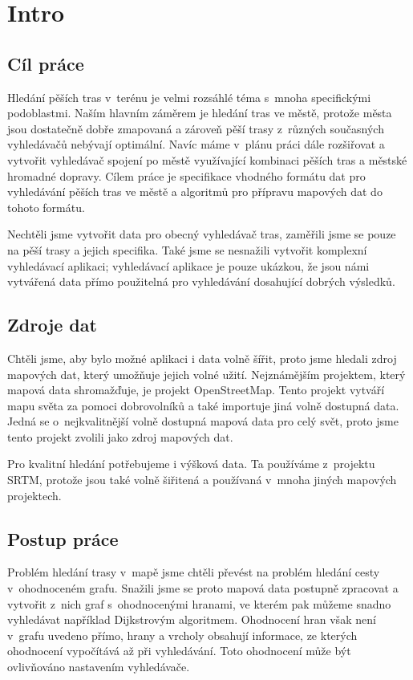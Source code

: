 \chapter{Intro}

\section{Cíl práce}
Hledání pěších tras v~terénu je velmi rozsáhlé téma s~mnoha specifickými
podoblastmi. Naším hlavním záměrem je hledání tras ve městě,
protože města jsou dostatečně dobře zmapovaná a zároveň pěší trasy z~různých
současných vyhledávačů nebývají optimální. Navíc máme v~plánu práci dále
rozšiřovat a vytvořit vyhledávač spojení po městě využívající kombinaci pěších
tras a městské hromadné dopravy.  Cílem práce je specifikace vhodného formátu
dat pro vyhledávání pěších tras ve městě a algoritmů pro přípravu mapových dat
do tohoto formátu. 

Nechtěli jsme vytvořit data pro obecný vyhledávač tras, zaměřili jsme se
pouze na pěší trasy a jejich specifika. Také jsme se nesnažili vytvořit komplexní
vyhledávací aplikaci; vyhledávací aplikace je pouze ukázkou, že jsou námi
vytvářená data přímo použitelná pro vyhledávání dosahující dobrých výsledků.

\section{Zdroje dat}
Chtěli jsme, aby bylo možné aplikaci i data volně šířit, proto jsme hledali
zdroj mapových dat, který umožňuje jejich volné užití. Nejznámějším projektem,
který mapová data shromažďuje, je projekt OpenStreetMap. Tento projekt vytváří
mapu světa za pomoci dobrovolníků a také importuje jiná volně dostupná data.
Jedná se o~nejkvalitnější volně dostupná mapová data pro celý svět, proto jsme
tento projekt zvolili jako zdroj mapových dat.

Pro kvalitní hledání potřebujeme i výšková data. Ta používáme z~projektu SRTM,
\cite{srtmweb} protože jsou také volně šiřitená a používaná v~mnoha jiných
mapových projektech.

\section{Postup práce}
Problém hledání trasy v~mapě jsme chtěli převést na problém hledání cesty
v~ohodnoceném grafu. Snažili jsme se proto mapová data postupně zpracovat a
vytvořit z~nich graf s~ohodnocenými hranami, ve kterém pak můžeme snadno
vyhledávat například Dijkstrovým algoritmem. Ohodnocení hran však není v~grafu
uvedeno přímo, hrany a vrcholy obsahují informace, ze kterých ohodnocení
vypočítává až při vyhledávání. Toto ohodnocení může být ovlivňováno nastavením
vyhledávače.

